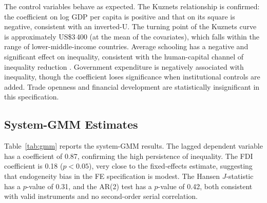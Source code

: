 \documentclass[12pt,a4paper]{article}
\begin{document}
The control variables behave as expected.  The Kuznets relationship is confirmed: the coefficient on log GDP per capita is positive and that on its square is negative, consistent with an inverted-U.  The turning point of the Kuznets curve is approximately US\$3\,400 (at the mean of the covariates), which falls within the range of lower-middle-income countries.  Average schooling has a negative and significant effect on inequality, consistent with the human-capital channel of inequality reduction \citep{Castello2010}.  Government expenditure is negatively associated with inequality, though the coefficient loses significance when institutional controls are added.  Trade openness and financial development are statistically insignificant in this specification.

\subsection{System-GMM Estimates}

Table~\ref{tab:gmm} reports the system-GMM results.  The lagged dependent variable has a coefficient of 0.87, confirming the high persistence of inequality.  The FDI coefficient is 0.18 ($p < 0.05$), very close to the fixed-effects estimate, suggesting that endogeneity bias in the FE specification is modest.  The Hansen $J$-statistic has a $p$-value of 0.31, and the AR(2) test has a $p$-value of 0.42, both consistent with valid instruments and no second-order serial correlation.
\end{document}
